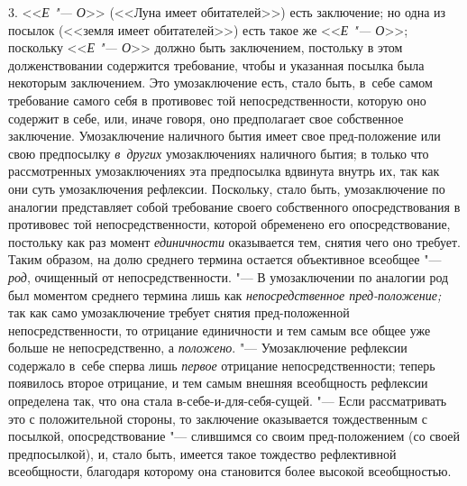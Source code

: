 3. <<{\em Е "--- О}>>
(<<Луна имеет обитателей>>) есть заключение; но одна из посылок
(<<земля имеет обитателей>>) есть такое же <<{\em Е "--- О}>>;
поскольку <<{\em Е "--- О}>>
должно быть заключением, постольку в этом долженствовании
содержится требование, чтобы и указанная посылка была некоторым
заключением. Это умозаключение есть, стало быть, в~себе самом требование
самого себя в противовес той непосредственности, которую оно содержит в
себе, или, иначе говоря, оно предполагает свое собственное заключение.
Умозаключение наличного бытия имеет свое пред-положение или свою
предпосылку {\em в~других}
умозаключениях наличного бытия; в только что
рассмотренных умозаключениях эта предпосылка вдвинута внутрь
их, так как они суть умозаключения рефлексии. Поскольку, стало быть,
умозаключение по аналогии представляет собой требование своего собственного
опосредствования в противовес той непосредственности, которой обременено
его опосредствование, постольку как раз момент
{\em единичности}
оказывается тем, снятия чего оно требует. Таким образом, на
долю среднего термина остается объективное всеобщее
"--- {\em род}, очищенный от
непосредственности. "--- В умозаключении по аналогии род был
моментом среднего термина лишь как
{\em непосредственное пред-положение;}
так как само умозаключение требует снятия пред-положенной
непосредственности, то отрицание единичности и тем самым все общее уже
больше не непосредственно, а
{\em положено}. "---
Умозаключение рефлексии содержало в~себе сперва лишь
{\em первое} отрицание
непосредственности; теперь появилось второе отрицание, и тем самым внешняя
всеобщность рефлексии определена так, что она стала
в-себе-и-для-себя-сущей. "--- Если рассматривать это с
положительной стороны, то заключение оказывается тождественным с посылкой,
опосредствование "--- слившимся со своим пред-положением (со
своей предпосылкой), и, стало быть, имеется такое тождество рефлективной
всеобщности, благодаря которому она становится более высокой
всеобщностью.

